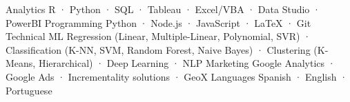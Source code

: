 

\begin{cvskills}

  \cvskill
    {Analytics} %
    {R · Python · SQL · Tableau · Excel/VBA · Data Studio · PowerBI} %
  \cvskill
    {Programming} %
    {Python · Node.js · JavaScript · LaTeX · Git} %
  \cvskill
    {Technical ML} %
    {Regression (Linear, Multiple-Linear, Polynomial, SVR) · Classification (K-NN, SVM, Random Forest, Naive Bayes) · Clustering (K-Means, Hierarchical) · Deep Learning · NLP} %
  \cvskill
    {Marketing} %
    {Google Analytics · Google Ads · Incrementality solutions · GeoX} %
  \cvskill
    {Languages} %
    {Spanish · English · Portuguese} %
\end{cvskills}

